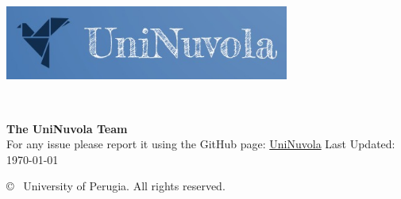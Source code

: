 \begin{titlepage}
    \thispagestyle{empty}
    \begin{center}
        \vspace*{1.5cm}
        \includegraphics[width=0.7\textwidth]{img/uninuvola_logo.jpeg} %


        \vspace{2.5cm}
        {\Huge \bfseries \doctitle} \\[1ex] %

        {\large \textit{\docsubtitle}} %

        \vspace{2.5cm}
        {\large \textbf{The UniNuvola Team}} \\[0.5ex] %

        \vspace{2.5cm}
        {\large For any issue please report it using the GitHub page: \href{https://github.com/UniNuvola/UniNuvola}{UniNuvola}}
        \vfill
        {\normalsize Last Updated: \today} %

        \vspace{1cm}
        {\small © \the\year\ University of Perugia. All rights reserved.} %
    \end{center}
\end{titlepage}